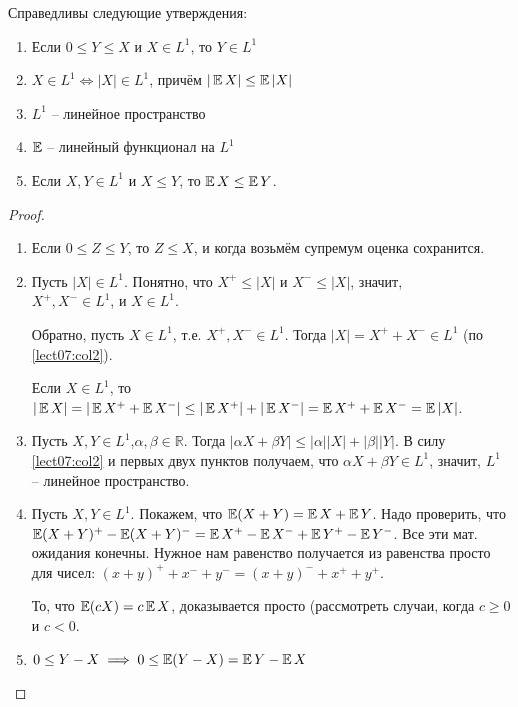     \begin{theorem}\label{lect07:th2}
        Справедливы следующие утверждения:
        \begin{enumerate}
            \item Если $0\le Y\le X$ и $X\in L^1$, то $Y\in L^1$
            \item $X\in L^1\iff |X|\in L^1$, причём $|\operatorname*{\mathbb{E}} X|\le \operatorname*{\mathbb{E}} |X|$
            \item $L^1$ -- линейное пространство
            \item $\operatorname*{\mathbb{E}}$ -- линейный функционал на $L^1$
            \item Если $X,Y\in L^1$ и $X\le Y$, то $\operatorname*{\mathbb{E}} X\le\operatorname*{\mathbb{E}} Y$.
        \end{enumerate}
    \end{theorem}
    \begin{proof}
        \begin{enumerate}
            \item Если $0\le Z\le Y$, то $Z\le X$, и когда возьмём супремум оценка сохранится.
            \item Пусть $|X|\in L^1$. Понятно, что $X^{+}\le |X|$ и $X^{-}\le |X|$, значит,\\ $X^{+},X^{-}\in L^1$, и $X\in L^1$.
            
            Обратно, пусть $X\in L^1$, т.е. $X^{+},X^{-}\in L^1$. Тогда $|X|=X^{+}+X^{-}\in L^1$ (по \ref{lect07:col2}).
            
            Если $X\in L^1$, то $|\operatorname*{\mathbb{E}} X|=|\operatorname*{\mathbb{E}} X^{+}+\operatorname*{\mathbb{E}} X^{-}|\le |\operatorname*{\mathbb{E}} X^{+}|+|\operatorname*{\mathbb{E}} X^{-}| = \operatorname*{\mathbb{E}} X^{+} + \operatorname*{\mathbb{E}} X^{-} = \operatorname*{\mathbb{E}} |X|$.
            \item Пусть $X,Y\in L^1$,$\alpha,\beta\in\mathbb{R}$. Тогда $|\alpha X+\beta Y|\le |\alpha||X|+|\beta||Y|$.
            В силу \ref{lect07:col2} и первых двух пунктов получаем, что $\alpha X+\beta Y \in L^1$, значит, $L^1$ -- линейное пространство.
            \item Пусть $X,Y\in L^1$. Покажем, что $\operatorname*{\mathbb{E}} (X+Y)=\operatorname*{\mathbb{E}} X+\operatorname*{\mathbb{E}} Y$. Надо проверить, что $\operatorname*{\mathbb{E}} (X+Y)^{+}-\operatorname*{\mathbb{E}} (X+Y)^{-}=\operatorname*{\mathbb{E}} X^{+}-\operatorname*{\mathbb{E}} X^{-}+\operatorname*{\mathbb{E}} Y^{+}-\operatorname*{\mathbb{E}} Y^{-}$. Все эти мат. ожидания конечны. Нужное нам равенство получается из равенства просто для чисел: $(x+y)^{+}+x^{-}+y^{-}=(x+y)^{-}+x^{+}+y^{+}$. 
            
            То, что $\operatorname*{\mathbb{E}} (cX) = c\operatorname*{\mathbb{E}} X$, доказывается просто (рассмотреть случаи, когда $c\ge 0$ и $c<0$.
            \item $0\le Y-X\implies 0\le\operatorname*{\mathbb{E}} (Y-X)=\operatorname*{\mathbb{E}} Y -\operatorname*{\mathbb{E}} X$
        \end{enumerate}
    \end{proof}